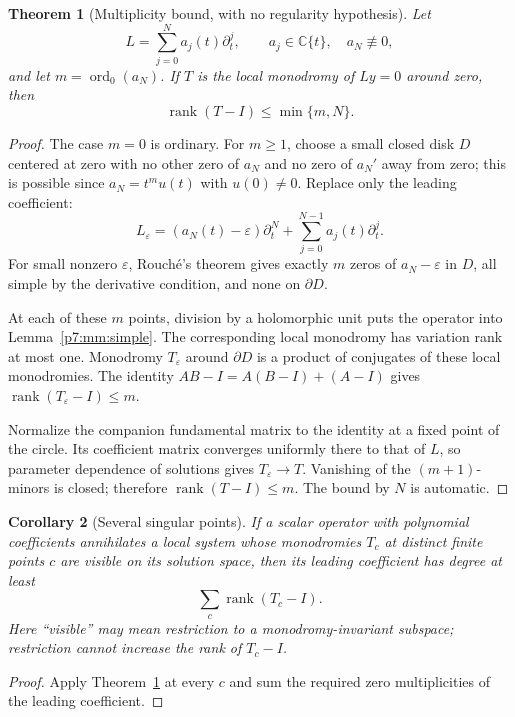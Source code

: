 \documentclass[11pt,a4paper]{article}
\newtheorem{theorem}{Theorem}[section]
\newtheorem{corollary}[theorem]{Corollary}
\theoremstyle{definition}
\theoremstyle{remark}
\numberwithin{equation}{section}
\begin{document}
\begin{theorem}[Multiplicity bound, with no regularity hypothesis]
\label{p7:mm:main}
Let
\[
 L=\sum_{j=0}^N a_j(t)\partial_t^j,\qquad
 a_j\in\mathbb C\{t\},\quad a_N\not\equiv0,
\]
and let $m=\operatorname{ord}_0(a_N)$. If $T$ is the local monodromy of
$Ly=0$ around zero, then
\[
 \operatorname{rank}(T-I)\le\min\{m,N\}.
\]
\end{theorem}
\begin{proof}
The case $m=0$ is ordinary. For $m\ge1$, choose a small closed disk $D$
centered at zero with no other zero of $a_N$ and no zero of $a_N'$ away
from zero; this is possible since $a_N=t^mu(t)$ with $u(0)\ne0$.
Replace only the leading coefficient:
\[
 L_\varepsilon=(a_N(t)-\varepsilon)\partial_t^N
                    +\sum_{j=0}^{N-1}a_j(t)\partial_t^j.
\]
For small nonzero $\varepsilon$, Rouch\'e's theorem gives exactly $m$
zeros of $a_N-\varepsilon$ in $D$, all simple by the derivative condition,
and none on $\partial D$.

At each of these $m$ points, division by a holomorphic unit puts the
operator into Lemma~\ref{p7:mm:simple}. The corresponding local monodromy
has variation rank at most one. Monodromy $T_\varepsilon$ around
$\partial D$ is a product of conjugates of these local monodromies.
The identity $AB-I=A(B-I)+(A-I)$ gives
$\operatorname{rank}(T_\varepsilon-I)\le m$.

Normalize the companion fundamental matrix to the identity at a fixed
point of the circle. Its coefficient matrix converges uniformly there
to that of $L$, so parameter dependence of solutions gives
$T_\varepsilon\to T$. Vanishing of the $(m+1)$-minors is closed;
therefore $\operatorname{rank}(T-I)\le m$. The bound by $N$ is automatic.
\end{proof}

\begin{corollary}[Several singular points]\label{p7:mm:sum}
If a scalar operator with polynomial coefficients annihilates a local
system whose monodromies $T_c$ at distinct finite points $c$ are visible
on its solution space, then its leading coefficient has degree at least
\[
 \sum_c\operatorname{rank}(T_c-I).
\]
Here ``visible'' may mean restriction to a monodromy-invariant subspace;
restriction cannot increase the rank of $T_c-I$.
\end{corollary}
\begin{proof}
Apply Theorem~\ref{p7:mm:main} at every $c$ and sum the required zero
multiplicities of the leading coefficient.
\end{proof}
\end{document}
